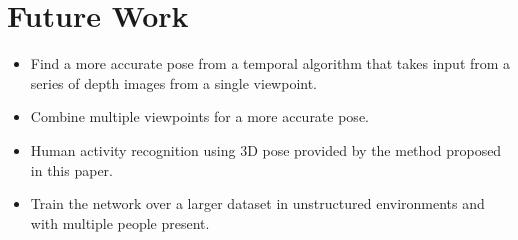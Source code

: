 \chapter{Future Work}

\begin{itemize}
\item Find a more accurate pose from a temporal algorithm that takes input from a series of depth images from a single viewpoint.
\item Combine multiple viewpoints for a more accurate pose.
\item Human activity recognition using 3D pose provided by the method proposed in this paper.
\item Train the network over a larger dataset in unstructured environments and with multiple people present.
\end{itemize}
